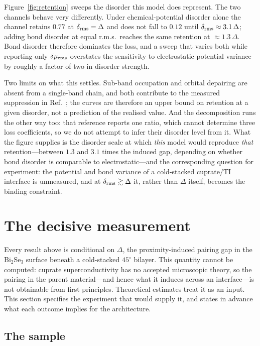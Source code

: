 \documentclass[aps,prb,twocolumn,superscriptaddress,floatfix,nofootinbib]{revtex4-2}
\begin{document}
Figure~\ref{fig:retention} sweeps the disorder this model does represent. The
two channels behave very differently. Under chemical-potential disorder alone
the channel retains $0.77$ at $\delta_{\rm rms} = \Delta$ and does not fall to
$0.12$ until $\delta_{\rm rms} \approx 3.1\,\Delta$; adding bond disorder at
equal r.m.s.\ reaches the same retention at $\approx 1.3\,\Delta$. Bond
disorder therefore dominates the loss, and a sweep that varies both while
reporting only $\delta\mu_{\rm rms}$ overstates the sensitivity to
electrostatic potential variance by roughly a factor of two in disorder
strength.

Two limits on what this settles. Sub-band occupation and orbital depairing are
absent from a single-band chain, and both contribute to the measured
suppression in Ref.~\cite{MicrosoftPb2026}; the curves are therefore an upper
bound on retention at a given disorder, not a prediction of the realised value.
And the decomposition runs the other way too: that reference reports one ratio,
which cannot determine three loss coefficients, so we do not attempt to infer
their disorder level from it. What the figure supplies is the disorder scale at
which \emph{this} model would reproduce \emph{that} retention---between $1.3$
and $3.1$ times the induced gap, depending on whether bond disorder is
comparable to electrostatic---and the corresponding question for experiment:
the potential and bond variance of a cold-stacked cuprate/TI interface is
unmeasured, and at $\delta_{\rm rms} \gtrsim \Delta$ it, rather than $\Delta$
itself, becomes the binding constraint.

\section{The decisive measurement}
\label{sec:milestone}

Every result above is conditional on $\Delta$, the proximity-induced pairing
gap in the Bi$_2$Se$_3$ surface beneath a cold-stacked $45^\circ$ bilayer.
This quantity cannot be computed: cuprate superconductivity has no accepted
microscopic theory, so the pairing in the parent material---and hence what it
induces across an interface---is not obtainable from first principles.
Theoretical estimates treat it as an input. This section specifies the
experiment that would supply it, and states in advance what each outcome
implies for the architecture.

\subsection{The sample}
\end{document}
